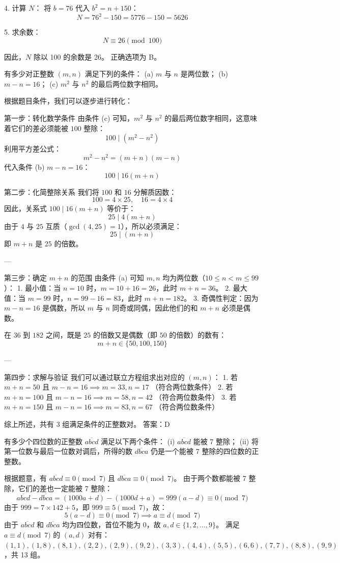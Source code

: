 \begin{questions}
\begin{solution}
4. 计算 $N$：
   将 $b = 76$ 代入 $b^2 = n + 150$：
   \[ N = 76^2 - 150 = 5776 - 150 = 5626 \]

5. 求余数：
   \[ N \equiv 26 \pmod{100} \]

因此，$N$ 除以 100 的余数是 26。
正确选项为 B。
\end{solution}

\question
有多少对正整数 $(m, n)$ 满足下列的条件：
(a) $m$ 与 $n$ 是两位数；
(b) $m - n = 16$；
(c) $m^2$ 与 $n^2$ 的最后两位数字相同。

\begin{solution}
根据题目条件，我们可以逐步进行转化：

第一步：转化数学条件
由条件 (c) 可知，$m^2$ 与 $n^2$ 的最后两位数字相同，这意味着它们的差必须能被 $100$ 整除：
\[ 100 \mid (m^2 - n^2) \]
利用平方差公式：
\[ m^2 - n^2 = (m + n)(m - n) \]
代入条件 (b) $m - n = 16$：
\[ 100 \mid 16(m + n) \]

第二步：化简整除关系
我们将 $100$ 和 $16$ 分解质因数：
\[ 100 = 4 \times 25, \quad 16 = 4 \times 4 \]
因此，关系式 $100 \mid 16(m + n)$ 等价于：
\[ 25 \mid 4(m + n) \]
由于 $4$ 与 $25$ 互质（$\gcd(4, 25) = 1$），所以必须满足：
\[ 25 \mid (m + n) \]
即 $m + n$ 是 $25$ 的倍数。

---

第三步：确定 $m + n$ 的范围
由条件 (a) 可知 $m, n$ 均为两位数（$10 \le n < m \le 99$）：
1. 最小值：当 $n = 10$ 时，$m = 10 + 16 = 26$，此时 $m + n = 36$。
2. 最大值：当 $m = 99$ 时，$n = 99 - 16 = 83$，此时 $m + n = 182$。
3. 奇偶性判定：因为 $m - n = 16$ 是偶数，所以 $m$ 与 $n$ 同奇或同偶，因此他们的和 $m + n$ 必须是偶数。

在 $36$ 到 $182$ 之间，既是 $25$ 的倍数又是偶数（即 $50$ 的倍数）的数有：
\[ m + n \in \{50, 100, 150\} \]

---

 第四步：求解与验证
我们可以通过联立方程组求出对应的 $(m, n)$：
1. 若 $m + n = 50$ 且 $m - n = 16 \implies m = 33, n = 17$ （符合两位数条件）
2. 若 $m + n = 100$ 且 $m - n = 16 \implies m = 58, n = 42$ （符合两位数条件）
3. 若 $m + n = 150$ 且 $m - n = 16 \implies m = 83, n = 67$ （符合两位数条件）

综上所述，共有 3 组满足条件的正整数对。
答案：D
\end{solution}
\question
有多少个四位数的正整数 $\overline{abcd}$ 满足以下两个条件：
(i) $\overline{abcd}$ 能被 7 整除；
(ii) 将第一位数与最后一位数对调后，所得的数 $\overline{dbca}$ 仍是一个能被 7 整除的四位数的正整数。

\begin{solution}
根据题意，有 $\overline{abcd} \equiv 0 \pmod 7$ 且 $\overline{dbca} \equiv 0 \pmod 7$。
由于两个数都能被 7 整除，它们的差也一定能被 7 整除：
\[ \overline{abcd} - \overline{dbca} = (1000a + d) - (1000d + a) = 999(a - d) \equiv 0 \pmod 7 \]
由于 $999 = 7 \times 142 + 5$，即 $999 \equiv 5 \pmod 7$，故：
\[ 5(a - d) \equiv 0 \pmod 7 \implies a \equiv d \pmod 7 \]
由于 $\overline{abcd}$ 和 $\overline{dbca}$ 均为四位数，首位不能为 0，故 $a, d \in \{1, 2, \dots, 9\}$。
满足 $a \equiv d \pmod 7$ 的 $(a, d)$ 对有：
$(1,1), (1,8), (8,1), (2,2), (2,9), (9,2), (3,3), (4,4), (5,5), (6,6), (7,7), (8,8), (9,9)$，共 13 组。


\end{solution}
\end{questions}
